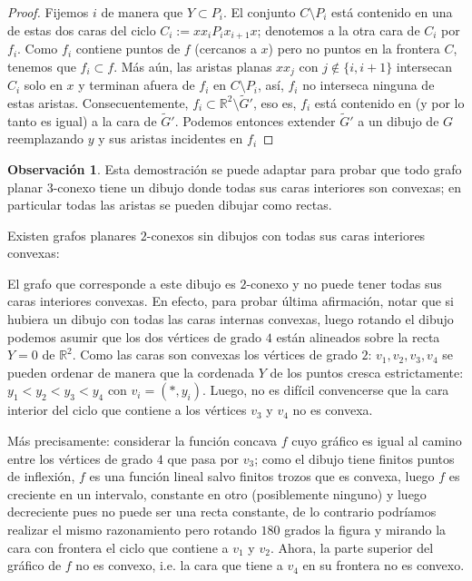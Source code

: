 \documentclass[12pt]{report}
\theoremstyle{plain}
\theoremstyle{definition}
\newtheorem{obs}[theorem]{Observación}
\newcommand{\reals}{\mathbb{R}}
\begin{document}
\begin{proof}
Fijemos $i$ de manera que $Y \subset P_i$. El conjunto $C \setminus P_i$ está contenido en una de estas dos caras del ciclo $C_i := x x_i P_i x_{i+1} x$; denotemos a la otra cara de $C_i$ por $f_i$. Como $f_i$ contiene puntos de $f$ (cercanos a $x$) pero no puntos en la frontera $C$, tenemos que $f_i \subset f$. Más aún, las aristas planas $x x_j$ con $j \not \in \{ i, i+1 \}$ intersecan $C_i$ solo en $x$ y terminan afuera de $f_i$ en $C \setminus P_i$, así, $f_i$ no interseca ninguna de estas aristas. Consecuentemente, $f_i \subset \reals^2 \setminus \tilde G'$, eso es, $f_i$ está contenido en (y por lo tanto es igual) a la cara de $\tilde G '$. Podemos entonces extender $\tilde G '$ a un dibujo de $G$ reemplazando $y$ y sus aristas incidentes en $f_i$
\end{proof}

\begin{obs}
Esta demostración se puede adaptar para probar que todo grafo planar $3$-conexo tiene un dibujo donde todas sus caras interiores son convexas; en particular todas las aristas se pueden dibujar como rectas.

Existen grafos planares $2$-conexos sin dibujos con todas sus caras interiores convexas:

El grafo que corresponde a este dibujo es $2$-conexo y no puede tener todas sus caras interiores convexas. En efecto, para probar última afirmación, notar que si hubiera un dibujo con todas las caras internas convexas, luego rotando el dibujo podemos asumir que los dos vértices de grado $4$ están alineados sobre la recta $Y = 0$ de $\reals^2$. Como las caras son convexas los vértices de grado $2$: $v_1,v_2,v_3,v_4$ se pueden ordenar de manera que la cordenada $Y$ de los puntos cresca estrictamente: $y_1<y_2<y_3<y_4$ con $v_i = (*,y_i)$. Luego, no es difícil convencerse que la cara interior del ciclo que contiene a los vértices $v_3$ y $v_4$ no es convexa.

Más precisamente: considerar la función concava $f$ cuyo gráfico es igual al camino entre los vértices de grado $4$ que pasa por $v_3$; como el dibujo tiene finitos puntos de inflexión, $f$ es una función lineal salvo finitos trozos que es convexa, luego $f$ es creciente en un intervalo, constante en otro (posiblemente ninguno) y luego decreciente pues no puede ser una recta constante, de lo contrario podríamos realizar el mismo razonamiento pero rotando $180$ grados la figura y mirando la cara con frontera el ciclo que contiene a $v_1$ y $v_2$. Ahora, la parte superior del gráfico de $f$ no es convexo, i.e. la cara que tiene a $v_4$ en su frontera no es convexo.
\end{obs}
\end{document}
